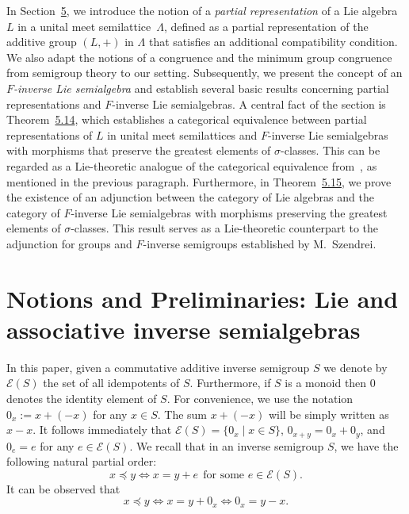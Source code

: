 \documentclass[10pt,a4paper]{amsart}
\theoremstyle{definition}
\theoremstyle{remark}
\numberwithin{equation}{section}
\newtheorem*{Theorem A}{\textbf{Theorem A}}
\newtheorem*{Corollary E}{\textbf{Corollary E}}
\newtheorem*{Corollary F}{\textbf{Corollary F}}
\newtheorem*{Theorem B}{\textbf{Theorem B}}
\newtheorem*{Theorem C}{\textbf{Theorem C}}
\newtheorem*{Theorem D}{\textbf{Theorem B}}
\newtheorem*{p a}{\textbf{Proof of  Theorem A}}
\newtheorem*{p b}{\textbf{Proof of Theorem B}}
\newtheorem*{p c}{\textbf{Proof of  Theorem C}}
\newtheorem*{p d}{\textbf{Proof of  Theorem D}}
\newcommand{\E}{\mathcal{E}}
\newcommand{\0}{{\vartheta}}
\begin{document}
In Section~\href{https://arxiv.org/abs/2505.03081v2}{5}, we introduce the notion of a {\em partial representation} of a Lie algebra $L$ in a unital meet semilattice~$\Lambda$, defined as a partial representation of the additive group $(L,+)$ in $\Lambda$ that satisfies an additional compatibility condition. We also adapt the notions of 
 a congruence and the minimum group congruence from semigroup theory to our setting. Subsequently, we present the concept of an {\em $F$-inverse Lie semialgebra} and establish several  basic results concerning partial  representations and $F$-inverse Lie semialgebras. A central  fact of the section is Theorem~\href{https://arxiv.org/abs/2505.03081v2}{5.14}, which establishes a categorical equivalence between partial representations of $L$ in unital meet semilattices and $F$-inverse Lie semialgebras with morphisms that preserve the greatest elements of $\sigma$-classes. This can be regarded as a Lie-theoretic analogue of the categorical equivalence from~\cite[VII.6]{Petrich1984}, as  mentioned in the previous paragraph. Furthermore, in Theorem~\href{https://arxiv.org/abs/2505.03081v2}{5.15}, we prove the existence of an adjunction between the category of Lie algebras and the category of $F$-inverse Lie semialgebras with morphisms preserving the greatest elements of $\sigma$-classes. This result serves as a Lie-theoretic counterpart to the adjunction for groups and $F$-inverse semigroups established by M.~Szendrei.





\section{Notions and Preliminaries: Lie and associative inverse semialgebras}\label{s: preliminaries}

In this paper, given  a commutative additive inverse semigroup $S$ we denote by $\E(S)$ the set of all idempotents of $S$. Furthermore, if $S$ is a monoid then $0$ denotes the identity element of $S$. For convenience, we use the notation  $0_x:=x +(-x)$ for any $x\in S.$ The sum $
x +(-x)$ will be simply written as $x-x.$ It follows immediately that $\E(S)=\{0_x\mid x\in S\}$, $0_{x+y}=0_x+0_y$, and $0_e=e$ for any $e\in \E(S)$. We recall that in an inverse semigroup $S$, we have the following natural partial order: 
\[x\preceq y \Longleftrightarrow x=y+e~~\text{for some } e\in \E(S). \] It can be observed that 
 \begin{equation}\label{eq_order}
    x\preceq y \Longleftrightarrow x=y+0_{x}\Longleftrightarrow 0_x=y-x.
\end{equation}
\end{document}
